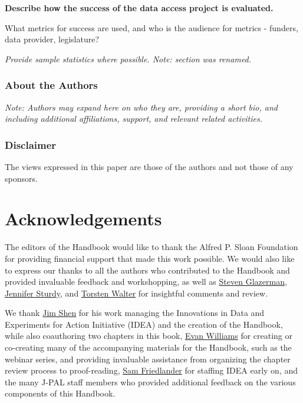 \documentclass[
]{book}
\begin{document}
\textbf{Describe how the success of the data access project is evaluated.}

What metrics for success are used, and who is the audience for metrics - funders, data provider, legislature?

\emph{Provide sample statistics where possible. Note: section was renamed.}

\hypertarget{about-the-authors-10}{%
\subsection*{About the Authors}\label{about-the-authors-10}}

\emph{Note: Authors may expand here on who they are, providing a short bio, and including additional affiliations, support, and relevant related activities.}

\hypertarget{disclaimer-1}{%
\subsection*{Disclaimer}\label{disclaimer-1}}

The views expressed in this paper are those of the authors and not those of any sponsors.

\hypertarget{handbook_acknowledgements}{%
\chapter*{Acknowledgements}\label{handbook_acknowledgements}}

The editors of the Handbook would like to thank the Alfred P. Sloan Foundation for providing financial support that made this work possible. We would also like to express our thanks to all the authors who contributed to the Handbook and provided invaluable feedback and workshopping, as well as \href{https://www.poverty-action.org/people/steven-glazerman}{Steven Glazerman}, \href{https://www.bitss.org/people/jennifer-sturdy/}{Jennifer Sturdy}, and \href{https://nyuad.nyu.edu/en/academics/divisions/social-science/faculty/torsten-bernd-norbert-figueiredo-walter.html}{Torsten Walter} for insightful comments and review.

We thank \href{https://www.povertyactionlab.org/person/shen}{Jim Shen} for his work managing the Innovations in Data and Experiments for Action Initiative (IDEA) and the creation of the Handbook, while also coauthoring two chapters in this book, \href{https://www.povertyactionlab.org/person/williams}{Evan Williams} for creating or co-creating many of the accompanying materials for the Handbook, such as the webinar series, and providing invaluable assistance from organizing the chapter review process to proof-reading, \href{https://www.povertyactionlab.org/person/friedlander}{Sam Friedlander} for staffing IDEA early on, and the many J-PAL staff members who provided additional feedback on the various components of this Handbook.
\end{document}
